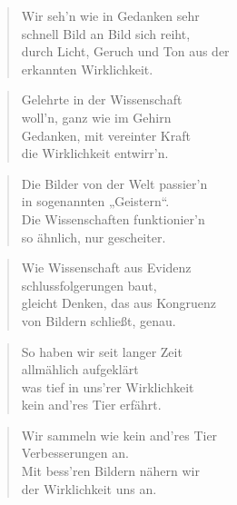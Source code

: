 \documentclass[10pt,a4paper]{article}
\begin{document}
\begin{multicols}{2}
\begin{verse}
Wir seh’n wie in Gedanken sehr \\
schnell Bild an Bild sich reiht, \\
durch Licht, Geruch und Ton aus der \\
erkannten Wirklichkeit. \\
\end{verse}

\begin{verse}
Gelehrte in der Wissenschaft \\
woll’n, ganz wie im Gehirn \\
Gedanken, mit vereinter Kraft \\
die Wirklichkeit entwirr’n. \\
\end{verse}

\begin{verse}
Die Bilder von der Welt passier’n \\
in sogenannten „Geistern“. \\
Die Wissenschaften funktionier’n \\
so ähnlich, nur gescheiter. \\
\end{verse}

\begin{verse}
Wie Wissenschaft aus Evidenz \\
schlussfolgerungen baut, \\
gleicht Denken, das aus Kongruenz \\
von Bildern schließt, genau. \\
\end{verse}

\begin{verse}
So haben wir seit langer Zeit \\
allmählich aufgeklärt \\
was tief in uns’rer Wirklichkeit \\
kein and’res Tier erfährt. \\
\end{verse}

\begin{verse}
Wir sammeln wie kein and’res Tier \\
Verbesserungen an. \\
Mit bess’ren Bildern nähern wir \\
der Wirklichkeit uns an. \\
\end{verse}


\end{multicols}
\end{document}
